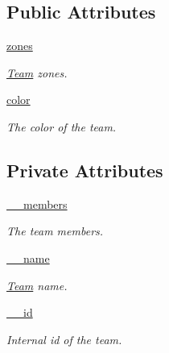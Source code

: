 \subsection*{\-Public \-Attributes}
\begin{DoxyCompactItemize}
\item 
\hyperlink{class_team_1_1_team_afbbfa95c8949d0da4ab274c8a4d88753}{zones}
\begin{DoxyCompactList}\small\item\em \hyperlink{class_team_1_1_team}{\-Team} zones. \end{DoxyCompactList}\item 
\hyperlink{class_team_1_1_team_a15e6e8ac7bbd66106dc357906ee6fcb7}{color}
\begin{DoxyCompactList}\small\item\em \-The color of the team. \end{DoxyCompactList}\end{DoxyCompactItemize}
\subsection*{\-Private \-Attributes}
\begin{DoxyCompactItemize}
\item 
\hyperlink{class_team_1_1_team_a8e3ff016fa310c75baa3d4ebd2bc4c17}{\-\_\-\-\_\-members}
\begin{DoxyCompactList}\small\item\em \-The team members. \end{DoxyCompactList}\item 
\hyperlink{class_team_1_1_team_a371424025affb2cf973b2a81eb4bc6d9}{\-\_\-\-\_\-name}
\begin{DoxyCompactList}\small\item\em \hyperlink{class_team_1_1_team}{\-Team} name. \end{DoxyCompactList}\item 
\hyperlink{class_team_1_1_team_a2a1c34bafb6d74b8e064c33cfbe4397b}{\-\_\-\-\_\-id}
\begin{DoxyCompactList}\small\item\em \-Internal id of the team. \end{DoxyCompactList}\end{DoxyCompactItemize}
